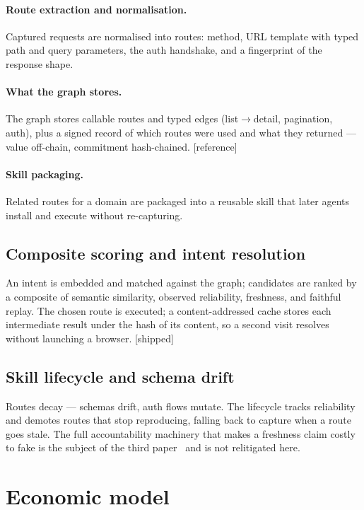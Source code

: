\documentclass[11pt]{article}
\newcommand{\impl}{\textcolor{green!55!black}{\small[shipped]}}
\newcommand{\refimpl}{\textcolor{blue!70!black}{\small[reference]}}
\begin{document}
\paragraph{Route extraction and normalisation.} Captured requests are normalised
into routes: method, URL template with typed path and query parameters, the auth
handshake, and a fingerprint of the response shape.
\paragraph{What the graph stores.} The graph stores callable routes and typed edges
(list$\to$detail, pagination, auth), plus a signed record of which routes were used
and what they returned --- value off-chain, commitment hash-chained. \refimpl
\paragraph{Skill packaging.} Related routes for a domain are packaged into a
reusable skill that later agents install and execute without re-capturing.

\subsection{Composite scoring and intent resolution}
An intent is embedded and matched against the graph; candidates are ranked by a
composite of semantic similarity, observed reliability, freshness, and faithful
replay. The chosen route is executed; a content-addressed cache stores each
intermediate result under the hash of its content, so a second visit resolves
without launching a browser. \impl

\subsection{Skill lifecycle and schema drift}
Routes decay --- schemas drift, auth flows mutate. The lifecycle tracks reliability
and demotes routes that stop reproducing, falling back to capture when a route goes
stale. The full accountability machinery that makes a freshness claim costly to
fake is the subject of the third paper~\cite{maintenance} and is not relitigated
here.

\section{Economic model}
\end{document}

